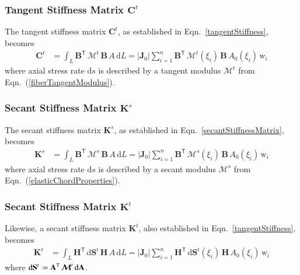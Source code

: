 \subsubsection{Tangent Stiffness Matrix $\mathbf{C}^t$}

The tangent stiffness matrix $\mathbf{C}^t$, as established in Eqn.~\eqref{tangentStiffness}, becomes
\begin{subequations}
	\begin{align}
		\mathbf{C}^t & = \int_L \mathbf{B}^{\mathsf{T}} \,  \boldsymbol{\mathcal{M}}^t \, \mathbf{B}  \, A \,  \mathrm{d} L
		= |\mathbf{J}_0| \sum_{i=1}^{n}   \mathbf{B}^{\mathsf{T}} \, \boldsymbol{\mathcal{M}}^t (\xi_i) \, \mathbf{B} \, A_0 (\xi_i) \, \mathrm{w}_i 
	\end{align}
\end{subequations} 
where axial stress rate $\mathrm{d} s$ is described by a tangent modulus $\boldsymbol{\mathcal{M}}^t$ from Eqn.~(\ref{fiberTangentModulus}).


\subsubsection{Secant Stiffness Matrix $\mathbf{K}^s$}

The secant stiffness matrix $\mathbf{K}^s$, as established in Eqn.~\eqref{secantStiffnessMatrix}, becomes
\begin{subequations}
	\begin{align}
		\mathbf{K}^s & = \int_L \mathbf{B}^{\mathsf{T}} \,  \boldsymbol{\mathcal{M}}^s \, \mathbf{B}  \, A \,  \mathrm{d} L
		= |\mathbf{J}_0| \sum_{i=1}^{n}  \mathbf{B}^{\mathsf{T}} \, \boldsymbol{\mathcal{M}}^s (\xi_i) \, \mathbf{B} \, A_0 (\xi_i) \, \mathrm{w}_i 
	\end{align}
\end{subequations} 
where axial stress rate $\mathrm{d} s$ is described by a secant modulus $\boldsymbol{\mathcal{M}}^{s}$ from Eqn.~(\ref{elasticChordProperties}).


\subsubsection{Secant Stiffness Matrix $\mathbf{K}^t$}

Likewise, a secant stiffness matrix $\mathbf{K}^t$, also established in Eqn.~\eqref{tangentStiffness}, becomes 
\begin{subequations}
	\begin{align}
		\mathbf{K}^t & = \int_L \mathbf{H}^{\mathsf{T}} \,  \mathrm{d} \mathbf{S}^t \, \mathbf{H}  \, A \,  \mathrm{d} L
		= | \mathbf{J}_0 | \sum_{i=1}^{n}  \mathbf{H}^{\mathsf{T}} \,  \mathrm{d} \mathbf{S}^t (\xi_i) \, \mathbf{H} \, A_0 (\xi_i) \, \mathrm{w}_i
	\end{align}
\end{subequations}
where $\mathrm{d} \mathbf{S}^t \defeq \mathbf{A}^{\mathsf{T}} \, \boldsymbol{\mathcal{M}}^t \, \mathrm{d} \mathbf{A}$.


